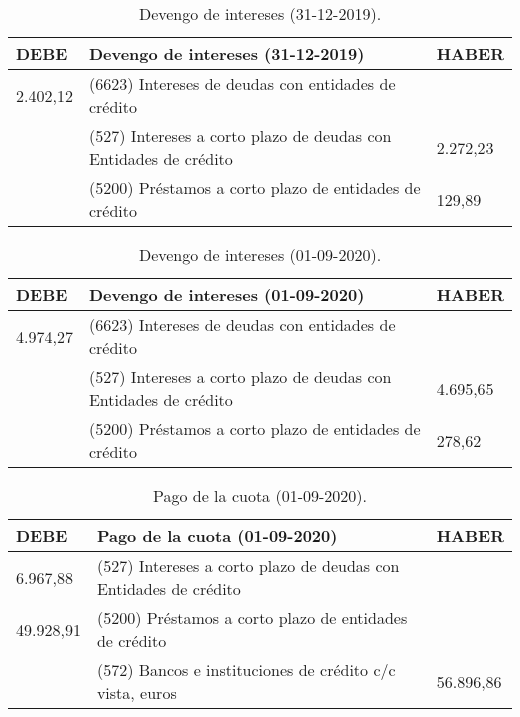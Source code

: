 \begin{table}[H]
    \centering
    \begin{tabular}{|p{2cm}|p{6cm}|p{2cm}|}
        \hline
        \rowcolor{blue!30}
        \textbf{DEBE} & \textbf{Devengo de intereses (31-12-2019)} & \textbf{HABER} \\
        \hline
        2.402,12 & (6623) Intereses de deudas con entidades de crédito & \\
        \hline
        & (527) Intereses a corto plazo de deudas con Entidades de crédito & 2.272,23 \\
        \hline
        & (5200) Préstamos a corto plazo de entidades de crédito & 129,89 \\
        \hline
    \end{tabular}
    \caption{Devengo de intereses (31-12-2019).}
    \label{tabla:devengo_intereses_2019}
\end{table}

\begin{table}[H]
    \centering
    \begin{tabular}{|p{2cm}|p{6cm}|p{2cm}|}
        \hline
        \rowcolor{blue!30}
        \textbf{DEBE} & \textbf{Devengo de intereses (01-09-2020)} & \textbf{HABER} \\
        \hline
        4.974,27 & (6623) Intereses de deudas con entidades de crédito & \\
        \hline
        & (527) Intereses a corto plazo de deudas con Entidades de crédito & 4.695,65 \\
        \hline
        & (5200) Préstamos a corto plazo de entidades de crédito & 278,62 \\
        \hline
    \end{tabular}
    \caption{Devengo de intereses (01-09-2020).}
    \label{tabla:devengo_intereses_2020}
\end{table}

\begin{table}[H]
    \centering
    \begin{tabular}{|p{2cm}|p{6cm}|p{2cm}|}
        \hline
        \rowcolor{blue!30}
        \textbf{DEBE} & \textbf{Pago de la cuota (01-09-2020)} & \textbf{HABER} \\
        \hline
        6.967,88 & (527) Intereses a corto plazo de deudas con Entidades de crédito & \\
        \hline
        49.928,91 & (5200) Préstamos a corto plazo de entidades de crédito & \\
        \hline
        & (572) Bancos e instituciones de crédito c/c vista, euros & 56.896,86 \\
        \hline
    \end{tabular}
    \caption{Pago de la cuota (01-09-2020).}
    \label{tabla:pago_cuota_2020}
\end{table}

